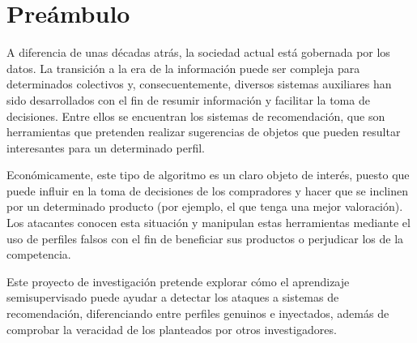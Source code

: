 

\section{Preámbulo}

A diferencia de unas décadas atrás, la sociedad actual está gobernada por los datos. La transición a la era de la información puede ser compleja para determinados colectivos y, consecuentemente, diversos sistemas auxiliares han sido desarrollados con el fin de resumir información y facilitar la toma de decisiones. Entre ellos se encuentran los sistemas de recomendación, que son herramientas que pretenden realizar sugerencias de objetos que pueden resultar interesantes para un determinado perfil.

Económicamente, este tipo de algoritmo es un claro objeto de interés, puesto que puede influir en la toma de decisiones de los compradores y hacer que se inclinen por un determinado producto (por ejemplo, el que tenga una mejor valoración). Los atacantes conocen esta situación y manipulan estas herramientas mediante el uso de perfiles falsos con el fin de beneficiar sus productos o perjudicar los de la competencia.

Este proyecto de investigación pretende explorar cómo el aprendizaje semisupervisado puede ayudar a detectar los ataques a sistemas de recomendación, diferenciando entre perfiles genuinos e inyectados, además de comprobar la veracidad de los planteados por otros investigadores.

